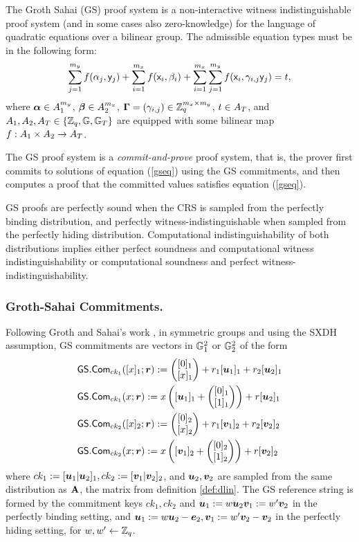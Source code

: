 
The Groth Sahai (GS) proof system is a non-interactive witness indistinguishable proof system (and in some cases also zero-knowledge) for the language of quadratic equations over a bilinear group. The admissible equation types must be in the following form:
\begin{equation}\label{gseq}
\sum_{j=1}^{m_y} f(\alpha_j, \mathsf{y}_j)+\sum_{i=1}^{m_x} f(\mathsf{x}_i, \beta_i)+\sum_{i=1}^{m_x} \sum_{j=1}^{m_y}  f(\mathsf{x}_i,\gamma_{i,j} \mathsf{y}_j)=t,
\end{equation}
 where $\boldsymbol \alpha  \in A_1^{m_y}$, $\boldsymbol \beta  \in A_2^{m_x}$, $\mathbf{{\Gamma}}=(\gamma_{i,j}) \in \mathbb{Z}_q^{m_x\times m_y}$, $t \in A_T$, and $A_1,A_2,A_T\in\{\mathbb{Z}_q,\mathbb{G},\mathbb{G}_T\}$ 
are equipped with some bilinear map $f:A_1\times A_2 \rightarrow A_T$.

The GS proof system is a \emph{commit-and-prove} proof system, that is, the prover first commits to solutions
of equation (\ref{gseq}) using the GS commitments, and then computes a proof that the committed values satisfies equation (\ref{gseq}).

GS proofs are perfectly sound when the CRS is sampled from the perfectly binding distribution, and perfectly witness-indistinguishable when sampled from the perfectly hiding distribution. Computational indistinguishability of  both distributions implies either perfect soundness and computational witness indistinguishability or computational soundness and perfect witness-indistinguishability.

\subsubsection{Groth-Sahai Commitments.}
Following Groth and Sahai's work \cite{EC:GroSah08}, in symmetric groups and using the SXDH assumption, GS commitments are vectors in $\mathbb{G}^2_1$ or $\mathbb{G}_2^2$ of the form
\begin{align*}
&{\mathsf{GS}}.\mathsf{Com}_{ck_1}([x]_1;{\boldsymbol{r}}):=\left(\begin{matrix}{[0]_1}\\{[x]_1}\end{matrix}\right)+r_1[{\boldsymbol{u}}_1]_1+{r}_2[{\boldsymbol{u}}_2]_1\\
&{\mathsf{GS}}.\mathsf{Com}_{ck_1}(x;{\boldsymbol{r}}):=x\left([{\boldsymbol{u}}_1]_1+\left(\begin{matrix}{[0]_1}\\{[1]_1}\end{matrix}\right)\right)+{r}[{\boldsymbol{u}}_2]_1\\
& {\mathsf{GS}}.\mathsf{Com}_{ck_2}([x]_2;{\boldsymbol{r}}):=\left(\begin{matrix}{[0]_2}\\{[x]_2}\end{matrix}\right)+r_1[{\boldsymbol{v}}_1]_2+{r}_2[{\boldsymbol{v}}_2]_2\\
&{\mathsf{GS}}.\mathsf{Com}_{ck_2}(x;{\boldsymbol{r}}):=x\left([{\boldsymbol{v}}_1]_2+\left(\begin{matrix}{[0]_2}\\{[1]_2}\end{matrix}\right)\right)+{r}[{\boldsymbol{v}}_2]_2
\end{align*}
where $ck_1:=[{\boldsymbol{u}}_1|{\boldsymbol{u}}_2]_1,ck_2:=[{\boldsymbol{v}}_1|{\boldsymbol{v}}_2]_2$, and ${\boldsymbol{u}}_2,{\boldsymbol{v}}_2$ are sampled from the same distribution as $\mathbf{{A}}$, the matrix from definition \ref{def:dlin}. The GS reference string is formed by the commitment keys $ck_1,ck_2$  and ${\boldsymbol{u}}_1:=w{\boldsymbol{u}}_2{\boldsymbol{v}}_1:=w'{\boldsymbol{v}}_2$ in the perfectly binding setting, and ${\boldsymbol{u}}_1:=w{\boldsymbol{u}}_2-{\boldsymbol{e}}_2,{\boldsymbol{v}}_1:=w'{\boldsymbol{v}}_2-{\boldsymbol{v}}_2$ in the perfectly hiding setting, for $w,w'\gets\mathbb{Z}_q$.
